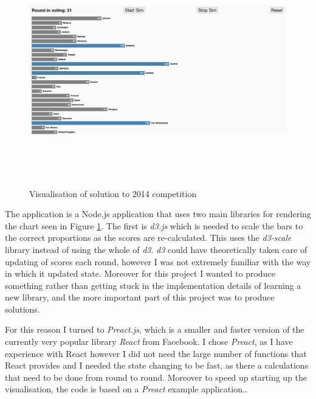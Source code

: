 \documentclass[12pt]{report}
\begin{document}
\begin{figure}[H]
\centering
\includegraphics[width=17cm, height=10cm]{./visualisation}
\caption{Visualisation of solution to 2014 competition}
\label{visScreenshot}
\end{figure}

The application is a Node.js application that uses two main libraries for rendering the chart seen in Figure \ref{visScreenshot}. The first is \textit{d3.js} which is needed to scale the bars to the correct proportions as the scores are re-calculated. This uses the \textit{d3-scale} library\cite{d3} instead of using the whole of \textit{d3}. \textit{d3} could have theoretically taken care of updating of scores each round, however I was not extremely familiar with the way in which it updated state. Moreover for this project I wanted to produce something rather than getting stuck in the implementation details of learning a new library, and the more important part of this project was to produce solutions.

For this reason I turned to \textit{Preact.js}\cite{Preact}, which is a smaller and faster version of the currently very popular library \textit{React}\cite{React} from Facebook. I chose \textit{Preact}, as I have experience with React however I did not need the large number of functions that React provides and I needed the state changing to be fast, as there a calculations that need to be done from round to round. Moreover to speed up starting up the visualisation, the code is based on a \textit{Preact} example application.\cite{PreactBoilerplate}.
\end{document}
